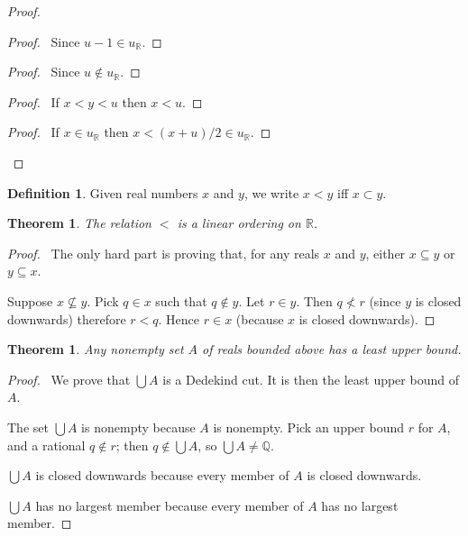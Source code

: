 \documentclass{article}
\let\qed\relax
\newtheorem{theorem}[axiom]{Theorem}
\theoremstyle{definition}
\newtheorem{definition}[axiom]{Definition}
\begin{document}
    \begin{proof}
        \pf
        \begin{proof}
            \pf\ Since $u-1 \in u_\mathbb{R}$.
        \end{proof}
        \begin{proof}
            \pf\ Since $u \notin u_\mathbb{R}$.
        \end{proof}
        \begin{proof}
            \pf\ If $x < y < u$ then $x < u$.
        \end{proof}
        \begin{proof}
            \pf\ If $x \in u_\mathbb{R}$ then $x < (x+u)/2 \in u_\mathbb{R}$.
        \end{proof}
        \qed
    \end{proof}
    \begin{definition}
        Given real numbers $x$ and $y$, we write $x < y$ iff $x \subset y$.
    \end{definition}

    \begin{theorem}
        The relation $<$ is a linear ordering on $\mathbb{R}$.
    \end{theorem}

    \begin{proof}
        \pf\ The only hard part is proving that, for any reals $x$ and $y$, either $x \subseteq y$ or
        $y \subseteq x$.

        Suppose $x \nsubseteq y$. Pick $q \in x$ such that $q \notin y$. Let $r \in y$. Then $q \nless r$
        (since $y$ is closed downwards) therefore $r < q$. Hence $r \in x$ (because $x$ is closed downwards).
        \qed
    \end{proof}

    \begin{theorem}
        Any nonempty set $A$ of reals bounded above has a least upper bound.
    \end{theorem}

    \begin{proof}
        \pf\ We prove that $\bigcup A$ is a Dedekind cut. It is then the least upper bound of $A$.

        The set $\bigcup A$ is nonempty because $A$ is nonempty. Pick an upper bound $r$ for $A$, and a
        rational $q \notin r$; then $q \notin \bigcup A$, so $\bigcup A \neq \mathbb{Q}$.

        $\bigcup A$ is closed downwards because every member of $A$ is closed downwards.

        $\bigcup A$ has no largest member because every member of $A$ has no largest member. \qed
    \end{proof}
\end{document}
